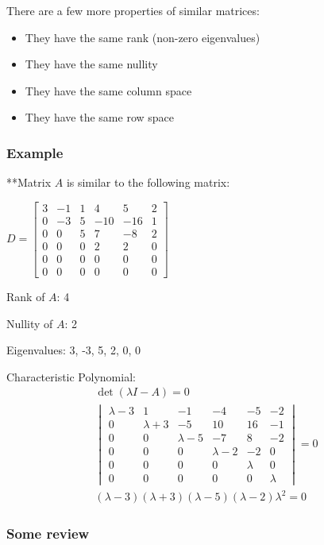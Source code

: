 \documentclass[
  letterpaper,
  DIV=11,
  numbers=noendperiod]{scrartcl}
\providecommand{\tightlist}{%
  \setlength{\itemsep}{0pt}\setlength{\parskip}{0pt}}\usepackage{longtable,booktabs,array}
\begin{document}
There are a few more properties of similar matrices:

\begin{itemize}
\tightlist
\item
  They have the same rank (non-zero eigenvalues)
\item
  They have the same nullity
\item
  They have the same column space
\item
  They have the same row space
\end{itemize}

\hypertarget{example-3}{%
\subsubsection{Example}\label{example-3}}

**Matrix \(A\) is similar to the following matrix:

\(D = \begin{bmatrix}3 & -1 & 1 & 4 & 5 & 2 \\ 0 & -3 & 5 & -10 & -16 & 1 \\ 0 & 0 & 5 & 7 & -8 & 2 \\ 0 & 0 & 0 & 2 & 2 & 0 \\ 0 & 0 & 0 & 0 & 0 & 0 \\ 0 & 0 & 0 & 0 & 0 & 0\end{bmatrix}\)

Rank of \(A\): 4

Nullity of \(A\): 2

Eigenvalues: 3, -3, 5, 2, 0, 0

Characteristic Polynomial: \begin{align*}
\det(\lambda I - A) = 0 \\
\begin{vmatrix}\lambda-3 & 1 & -1 & -4 & -5 & -2 \\ 0 & \lambda+3 & -5 & 10 & 16 & -1 \\ 0 & 0 & \lambda-5 & -7 & 8 & -2 \\ 0 & 0 & 0 & \lambda-2 & -2 & 0 \\ 0 & 0 & 0 & 0 & \lambda & 0 \\ 0 & 0 & 0 & 0 & 0 & \lambda\end{vmatrix} = 0 \\
(\lambda-3)(\lambda+3)(\lambda-5)(\lambda-2)\lambda^2 = 0
\end{align*}

\newpage{}

\hypertarget{some-review}{%
\subsubsection{Some review}\label{some-review}}
\end{document}
